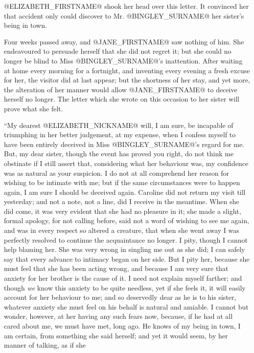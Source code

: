 @ELIZABETH_FIRSTNAME@ shook her head over this letter. It convinced her that
accident only could discover to Mr. @BINGLEY_SURNAME@ her sister's being in town.

Four weeks passed away, and @JANE_FIRSTNAME@ saw nothing of him. She endeavoured to
persuade herself that she did not regret it; but she could no longer be
blind to Miss @BINGLEY_SURNAME@'s inattention. After waiting at home every morning
for a fortnight, and inventing every evening a fresh excuse for her, the
visitor did at last appear; but the shortness of her stay, and yet more,
the alteration of her manner would allow @JANE_FIRSTNAME@ to deceive herself no
longer. The letter which she wrote on this occasion to her sister will
prove what she felt.

``My dearest @ELIZABETH_NICKNAME@ will, I am sure, be incapable of triumphing in her
better judgement, at my expense, when I confess myself to have been
entirely deceived in Miss @BINGLEY_SURNAME@'s regard for me. But, my dear sister,
though the event has proved you right, do not think me obstinate if I
still assert that, considering what her behaviour was, my confidence was
as natural as your suspicion. I do not at all comprehend her reason for
wishing to be intimate with me; but if the same circumstances were to
happen again, I am sure I should be deceived again. Caroline did not
return my visit till yesterday; and not a note, not a line, did I
receive in the meantime. When she did come, it was very evident that
she had no pleasure in it; she made a slight, formal apology, for not
calling before, said not a word of wishing to see me again, and was
in every respect so altered a creature, that when she went away I was
perfectly resolved to continue the acquaintance no longer. I pity,
though I cannot help blaming her. She was very wrong in singling me out
as she did; I can safely say that every advance to intimacy began on
her side. But I pity her, because she must feel that she has been acting
wrong, and because I am very sure that anxiety for her brother is the
cause of it. I need not explain myself farther; and though \textit{we} know
this anxiety to be quite needless, yet if she feels it, it will easily
account for her behaviour to me; and so deservedly dear as he is to
his sister, whatever anxiety she must feel on his behalf is natural and
amiable. I cannot but wonder, however, at her having any such fears now,
because, if he had at all cared about me, we must have met, long ago.
He knows of my being in town, I am certain, from something she said
herself; and yet it would seem, by her manner of talking, as if she
